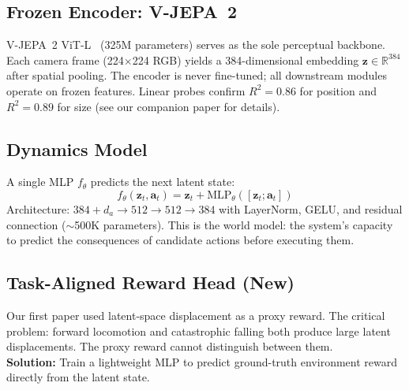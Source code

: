 \documentclass{article}
\begin{document}
\subsection{Frozen Encoder: V-JEPA~2}

V-JEPA~2 ViT-L~\citep{bardes2024vjepa} (325M parameters) serves as the sole perceptual backbone. Each camera frame (224$\times$224 RGB) yields a 384-dimensional embedding $\mathbf{z} \in \mathbb{R}^{384}$ after spatial pooling. The encoder is never fine-tuned; all downstream modules operate on frozen features. Linear probes confirm $R^2 = 0.86$ for position and $R^2 = 0.89$ for size (see our companion paper for details).

\subsection{Dynamics Model}

A single MLP $f_\theta$ predicts the next latent state:
\begin{equation}
    f_\theta(\mathbf{z}_t, \mathbf{a}_t) = \mathbf{z}_t + \text{MLP}_\theta([\mathbf{z}_t; \mathbf{a}_t])
\end{equation}
Architecture: $384{+}d_a \rightarrow 512 \rightarrow 512 \rightarrow 384$ with LayerNorm, GELU, and residual connection ($\sim$500K parameters). This is the world model: the system's capacity to predict the consequences of candidate actions before executing them.

\subsection{Task-Aligned Reward Head \textnormal{\small(New)}}

\begin{breakthroughbox}
\small Our first paper used latent-space displacement as a proxy reward. The critical problem: forward locomotion and catastrophic falling both produce large latent displacements. The proxy reward cannot distinguish between them.\\[2pt]
\textbf{Solution:} Train a lightweight MLP to predict ground-truth environment reward directly from the latent state.
\end{breakthroughbox}
\end{document}
